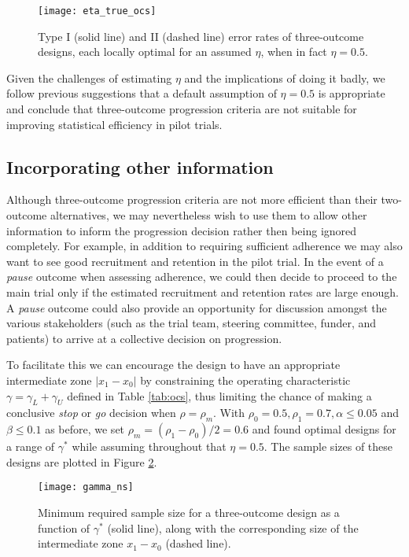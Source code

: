 \documentclass[referee, lineno, pdflatex,sn-vancouver,Numbered]{sn-jnl}%
\theoremstyle{thmstyleone}%
\theoremstyle{thmstyletwo}%
\theoremstyle{thmstylethree}%
\begin{document}
\begin{figure}
\centering
\texttt{[image: eta\_true\_ocs]}
\caption{Type I (solid line) and II (dashed line) error rates of three-outcome designs, each locally optimal for an assumed $\eta$, when in fact $\eta = 0.5$.}
\label{fig:eta_true_ocs}
\end{figure}

Given the challenges of estimating $\eta$ and the implications of doing it badly, we follow previous suggestions \cite{Sargent2001a, Dehbi2020} that a default assumption of $\eta = 0.5$ is appropriate and conclude that three-outcome progression criteria are not suitable for improving statistical efficiency in pilot trials.

\subsection{Incorporating other information}\label{sec:information}

Although three-outcome progression criteria are not more efficient than their two-outcome alternatives, we may nevertheless wish to use them to allow other information to inform the progression decision rather then being ignored completely. For example, in addition to requiring sufficient adherence we may also want to see good recruitment and retention in the pilot trial. In the event of a \emph{pause} outcome when assessing adherence, we could then decide to proceed to the main trial only if the estimated recruitment and retention rates are large enough. A \emph{pause} outcome could also provide an opportunity for discussion amongst the various stakeholders (such as the trial team, steering committee, funder, and patients) to arrive at a collective decision on progression.

To facilitate this we can encourage the design to have an appropriate intermediate zone $| x_1 - x_0|$ by constraining the operating characteristic $\gamma = \gamma_L + \gamma_U$ defined in Table \ref{tab:ocs}, thus limiting the chance of making a conclusive \emph{stop} or \emph{go} decision when $\rho = \rho_m$. With $\rho_0 = 0.5, \rho_1 = 0.7, \alpha \leq 0.05$ and $\beta \leq 0.1$ as before, we set $\rho_m = (\rho_1 - \rho_0)/2 = 0.6$ and found optimal designs for a range of $\gamma^*$ while assuming throughout that $\eta = 0.5$. The sample sizes of these designs are plotted in Figure \ref{fig:gamma_ns}.

\begin{figure}
\centering
\texttt{[image: gamma\_ns]}
\caption{Minimum required sample size for a three-outcome design as a function of $\gamma^*$ (solid line), along with the corresponding size of the intermediate zone $x_1 - x_0$ (dashed line).}
\label{fig:gamma_ns}
\end{figure}
\end{document}
